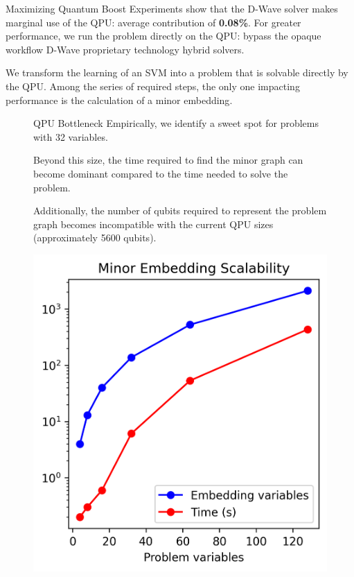 \begin{block}{Maximizing Quantum Boost} 
    Experiments show that the D-Wave solver makes marginal use of the QPU: average contribution of \textbf{0.08\%}. 
    For greater performance, we run the problem directly on the QPU: bypass the opaque workflow D-Wave proprietary technology hybrid solvers.
   
    We transform the learning of an SVM into a problem that is solvable directly by the QPU. Among the series of required steps, the only one impacting performance is the calculation of a minor embedding\cite{MEdwave}.
   
    \begin{figure}[h!]
        \centering
        \begin{minipage}{0.55\textwidth}
        \begin{alertblock}{QPU Bottleneck}
            Empirically, we identify a sweet spot for problems with 32 variables.
                        
            Beyond this size, the time required to find the minor graph can become dominant compared to the time needed to solve the problem.

            Additionally, the number of qubits required to represent the problem graph becomes incompatible with the current QPU sizes (approximately 5600 qubits).
        \end{alertblock}
        \end{minipage}%
        \hfill
        \begin{minipage}{0.4\textwidth}
            \centering
            \includegraphics[height=0.14\textheight]{logos/embedding_search_time.png}
        \end{minipage}
    \end{figure}
\end{block}